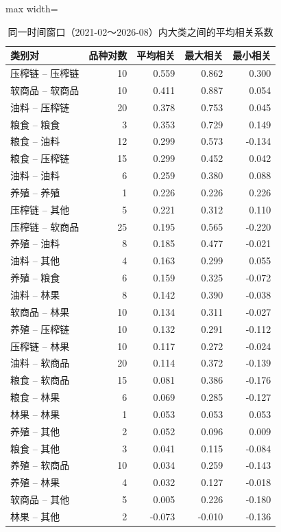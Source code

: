 \begin{table}[htbp]
\centering
\small
\caption{同一时间窗口（2021-02～2026-08）内大类之间的平均相关系数}
\label{tab:corr-group}
\begin{adjustbox}{max width=\textwidth}
\begin{tabular}{@{}lrrrr@{}}
\toprule
类别对 & 品种对数 & 平均相关 & 最大相关 & 最小相关 \\
\midrule
压榨链 -- 压榨链 & 10 & 0.559 & 0.862 & 0.300 \\
软商品 -- 软商品 & 10 & 0.411 & 0.887 & 0.054 \\
油料 -- 压榨链 & 20 & 0.378 & 0.753 & 0.045 \\
粮食 -- 粮食 & 3 & 0.353 & 0.729 & 0.149 \\
粮食 -- 油料 & 12 & 0.299 & 0.573 & -0.134 \\
粮食 -- 压榨链 & 15 & 0.299 & 0.452 & 0.042 \\
油料 -- 油料 & 6 & 0.259 & 0.380 & 0.088 \\
养殖 -- 养殖 & 1 & 0.226 & 0.226 & 0.226 \\
压榨链 -- 其他 & 5 & 0.221 & 0.312 & 0.110 \\
压榨链 -- 软商品 & 25 & 0.195 & 0.565 & -0.220 \\
养殖 -- 油料 & 8 & 0.185 & 0.477 & -0.021 \\
油料 -- 其他 & 4 & 0.163 & 0.299 & 0.055 \\
养殖 -- 粮食 & 6 & 0.159 & 0.325 & -0.072 \\
油料 -- 林果 & 8 & 0.142 & 0.390 & -0.038 \\
软商品 -- 林果 & 10 & 0.134 & 0.311 & -0.027 \\
养殖 -- 压榨链 & 10 & 0.132 & 0.291 & -0.112 \\
压榨链 -- 林果 & 10 & 0.117 & 0.272 & -0.024 \\
油料 -- 软商品 & 20 & 0.114 & 0.372 & -0.139 \\
粮食 -- 软商品 & 15 & 0.081 & 0.386 & -0.176 \\
粮食 -- 林果 & 6 & 0.069 & 0.285 & -0.127 \\
林果 -- 林果 & 1 & 0.053 & 0.053 & 0.053 \\
养殖 -- 其他 & 2 & 0.052 & 0.096 & 0.009 \\
粮食 -- 其他 & 3 & 0.041 & 0.115 & -0.084 \\
养殖 -- 软商品 & 10 & 0.034 & 0.259 & -0.143 \\
养殖 -- 林果 & 4 & 0.032 & 0.127 & -0.018 \\
软商品 -- 其他 & 5 & 0.005 & 0.226 & -0.180 \\
林果 -- 其他 & 2 & -0.073 & -0.010 & -0.136 \\
\bottomrule
\end{tabular}
\end{adjustbox}
\end{table}
